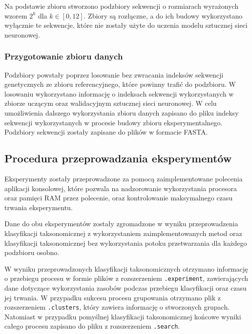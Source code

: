             Na podstawie zbioru stworzono podzbiory sekwencji o rozmiarach wyrażonych wzorem $2^k$ dla $k \in [0, 12]$. Zbiory są rozłączne, a do ich budowy wykorzystano wyłącznie te sekwencje, które nie zostały użyte do uczenia modelu sztucznej sieci neuronowej.

        \subsubsection{Przygotowanie zbioru danych}

            Podzbiory powstały poprzez losowanie bez zwracania indeksów sekwencji genetycznych ze zbioru referencyjnego, które powinny trafić do podzbioru. W losowaniu wykorzystano informację o indeksach sekwencji wykorzystanych w zbiorze uczącym oraz walidacyjnym sztucznej sieci neuronowej. W celu umożliwienia dalszego wykorzystania zbioru danych zapisano do pliku indeksy sekwencji wykorzystanych w procesie budowy zbioru eksperymentalnego. Podzbiory sekwencji zostały zapisane do plików w formacie FASTA.

    \subsection{Procedura przeprowadzania eksperymentów}

        Eksperymenty zostały przeprowadzone za pomocą zaimplementowane polecenia aplikacji konsolowej, które pozwala na nadzorowanie wykorzystania procesora oraz pamięci RAM przez polecenie, oraz kontrolowanie maksymalnego czasu trwania eksperymentu.

        Dane do obu eksperymentów zostały zgromadzone w wyniku przeprowadzenia klasyfikacji taksonomicznej z wykorzystaniem zaimplementowanych metod oraz klasyfikacji taksonomicznej bez wykorzystania potoku przetwarzania dla każdego podzbioru osobno.

        W wyniku przeprowadzonych klasyfikacji taksonomicznych otrzymano informację o przebiegu procesu w formie plików z rozszerzeniem \texttt{.experiment}, zawierających dane dotyczące wykorzystania zasobów podczas przebiegu klasyfikacji oraz czasu jej trwania. W przypadku sukcesu procesu grupowania otrzymano plik z rozszerzeniem \texttt{.clusters}, który zawiera informację o stworzonych grupach. Natomiast w przypadku pomyślnej klasyfikacji taksonomicznej końcowe wyniki całego procesu zapisano do pliku z rozszerzeniem \texttt{.search}.

